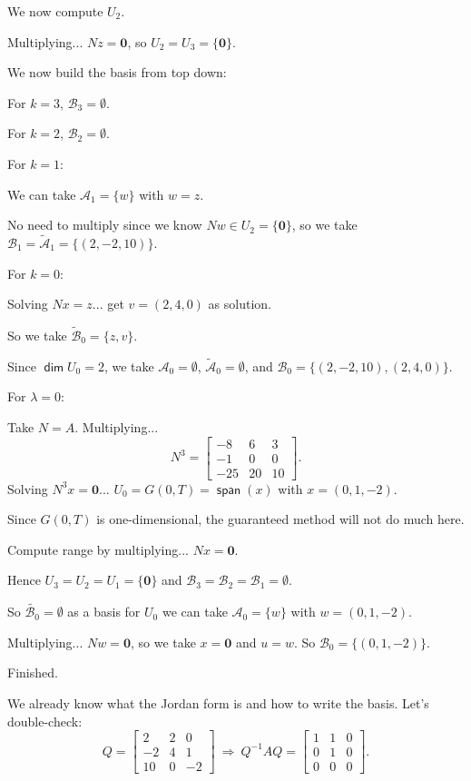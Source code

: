\documentclass[11pt]{article}
\newcommand{\1}{\mathbf{1}}
\newcommand{\0}{\mathbf{0}}
\newcommand{\A}{\mathcal{A}}
\newcommand{\B}{\mathcal{B}}
\DeclareMathOperator{\myspan}{\mathsf{span}}
\DeclareMathOperator{\mydim}{\mathsf{dim}}
\theoremstyle{definition}
\begin{document}
We now compute $U_2$.

Multiplying... $Nz = \0$, so $U_2 = U_3 = \{\0\}$.

We now build the basis from top down:

For $k=3$, $\B_3 = \emptyset$.

For $k=2$, $\B_2 = \emptyset$.

For $k=1$:

We can take $\A_1=\{w\}$ with $w=z$.

No need to multiply since we know $Nw \in U_2 = \{\0\}$, so we take $\B_1=\tilde{\A}_1=\{(2,-2,10)\}$.

For $k=0$:

Solving $Nx=z$... get $v=(2,4,0)$ as solution.

So we take $\tilde{\B}_0 = \{z,v\}$.

Since $\mydim U_0 = 2$, we take $\A_0 = \emptyset$, $\tilde{\A}_0 = \emptyset$, and $\B_0=\{(2,-2,10),(2,4,0)\}$.

For $\lambda=0$:

Take $N=A$.
Multiplying...
\[
N^3
=
\begin{bmatrix}
-8 & 6 & 3 \\
-1 & 0 & 0 \\
-25 & 20 & 10
\end{bmatrix}
.
\]
Solving $N^3 x = \0$... $U_0=G(0,T)=\myspan(x)$ with $x=(0,1,-2)$.

Since $G(0,T)$ is one-dimensional, the guaranteed method will not do much here.

Compute range by multiplying...
$N x = \0$.

Hence $ U_3 = U_2 = U_1 = \{\0\} $ and $\B_3 = \B_2 = \B_1 = \emptyset$.

So $\tilde{\B_0}=\emptyset$ as a basis for $U_0$ we can take ${\A}_0=\{w\}$ with $w=(0,1,-2)$.

Multiplying... $Nw=\0$, so we take $x=\0$ and $u=w$.
So $\B_0 = \{(0,1,-2)\}$.

Finished.

We already know what the Jordan form is and how to write the basis.
Let's double-check:
\[
Q=
\begin{bmatrix}
2 & 2 & 0 \\
-2 & 4 & 1 \\
10 & 0 & -2
\end{bmatrix}
\
\Longrightarrow
\
Q^{-1}AQ = 
\left[
\begin{array}{rr|r}
1 & 1 & 0 \\
0 & 1 & 0 \\
\hline
0 & 0 & 0
\end{array}
\right]
.
\]
\end{document}

